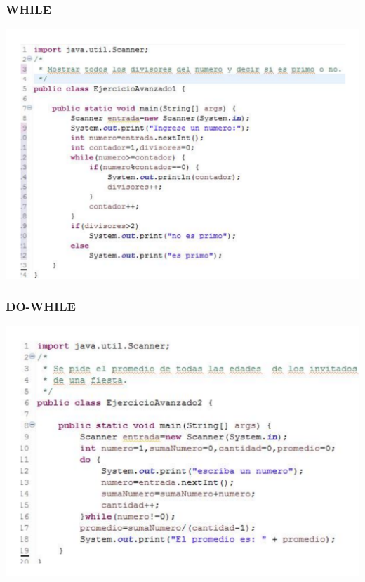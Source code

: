 \documentclass[11pt]{beamer}
\begin{document}
\begin{frame}
\frametitle{WHILE}
\begin{center}
\includegraphics[scale=0.37]{figuras/avanc.pdf}
\end{center}
\end{frame}

\begin{frame}
\frametitle{DO-WHILE}
\begin{center}
\includegraphics[scale=0.37]{figuras/do_.pdf}
\end{center}
\end{frame}
\end{document}
